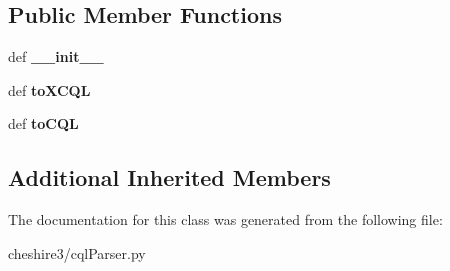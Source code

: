 \subsection*{Public Member Functions}
\begin{DoxyCompactItemize}
\item 
\hypertarget{classcheshire3_1_1cql_parser_1_1_index_a9093e7c267c250cb50bb462273556b27}{def {\bfseries \-\_\-\-\_\-init\-\_\-\-\_\-}}\label{classcheshire3_1_1cql_parser_1_1_index_a9093e7c267c250cb50bb462273556b27}

\item 
\hypertarget{classcheshire3_1_1cql_parser_1_1_index_a030f0ab80c8de2c9c29ed3a93f027b07}{def {\bfseries to\-X\-C\-Q\-L}}\label{classcheshire3_1_1cql_parser_1_1_index_a030f0ab80c8de2c9c29ed3a93f027b07}

\item 
\hypertarget{classcheshire3_1_1cql_parser_1_1_index_a53494b2b52048e22b25f26ffe38560f1}{def {\bfseries to\-C\-Q\-L}}\label{classcheshire3_1_1cql_parser_1_1_index_a53494b2b52048e22b25f26ffe38560f1}

\end{DoxyCompactItemize}
\subsection*{Additional Inherited Members}


The documentation for this class was generated from the following file\-:\begin{DoxyCompactItemize}
\item 
cheshire3/cql\-Parser.\-py\end{DoxyCompactItemize}
